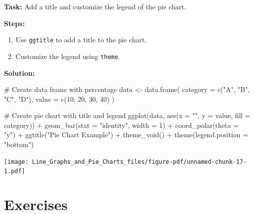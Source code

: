 \documentclass[
  letterpaper,
  DIV=11,
  numbers=noendperiod]{scrreprt}
\newenvironment{Shaded}{\begin{snugshade}}{\end{snugshade}}
\newcommand{\AttributeTok}[1]{\textcolor[rgb]{0.40,0.45,0.13}{#1}}
\newcommand{\CommentTok}[1]{\textcolor[rgb]{0.37,0.37,0.37}{#1}}
\newcommand{\DecValTok}[1]{\textcolor[rgb]{0.68,0.00,0.00}{#1}}
\newcommand{\FunctionTok}[1]{\textcolor[rgb]{0.28,0.35,0.67}{#1}}
\newcommand{\NormalTok}[1]{\textcolor[rgb]{0.00,0.23,0.31}{#1}}
\newcommand{\OtherTok}[1]{\textcolor[rgb]{0.00,0.23,0.31}{#1}}
\newcommand{\SpecialCharTok}[1]{\textcolor[rgb]{0.37,0.37,0.37}{#1}}
\newcommand{\StringTok}[1]{\textcolor[rgb]{0.13,0.47,0.30}{#1}}
\providecommand{\tightlist}{%
  \setlength{\itemsep}{0pt}\setlength{\parskip}{0pt}}\usepackage{longtable,booktabs,array}
\begin{document}
\textbf{Task:} Add a title and customize the legend of the pie chart.

\textbf{Steps:}

\begin{enumerate}
\def\labelenumi{\arabic{enumi}.}
\tightlist
\item
  Use \texttt{ggtitle} to add a title to the pie chart.
\item
  Customize the legend using \texttt{theme}.
\end{enumerate}

\textbf{Solution:}

\begin{Shaded}
\begin{Highlighting}[]
\CommentTok{\# Create data frame with percentage}
\NormalTok{data }\OtherTok{\textless{}{-}} \FunctionTok{data.frame}\NormalTok{(}
  \AttributeTok{category =} \FunctionTok{c}\NormalTok{(}\StringTok{"A"}\NormalTok{, }\StringTok{"B"}\NormalTok{, }\StringTok{"C"}\NormalTok{, }\StringTok{"D"}\NormalTok{),}
  \AttributeTok{value =} \FunctionTok{c}\NormalTok{(}\DecValTok{10}\NormalTok{, }\DecValTok{20}\NormalTok{, }\DecValTok{30}\NormalTok{, }\DecValTok{40}\NormalTok{)}
\NormalTok{)}

\CommentTok{\# Create pie chart with title and legend}
\FunctionTok{ggplot}\NormalTok{(data, }\FunctionTok{aes}\NormalTok{(}\AttributeTok{x =} \StringTok{""}\NormalTok{, }\AttributeTok{y =}\NormalTok{ value, }\AttributeTok{fill =}\NormalTok{ category)) }\SpecialCharTok{+}
  \FunctionTok{geom\_bar}\NormalTok{(}\AttributeTok{stat =} \StringTok{"identity"}\NormalTok{, }\AttributeTok{width =} \DecValTok{1}\NormalTok{) }\SpecialCharTok{+}
  \FunctionTok{coord\_polar}\NormalTok{(}\AttributeTok{theta =} \StringTok{"y"}\NormalTok{) }\SpecialCharTok{+}
  \FunctionTok{ggtitle}\NormalTok{(}\StringTok{"Pie Chart Example"}\NormalTok{) }\SpecialCharTok{+}
  \FunctionTok{theme\_void}\NormalTok{() }\SpecialCharTok{+}
  \FunctionTok{theme}\NormalTok{(}\AttributeTok{legend.position =} \StringTok{"bottom"}\NormalTok{)}
\end{Highlighting}
\end{Shaded}

\texttt{[image: Line\_Graphs\_and\_Pie\_Charts\_files/figure-pdf/unnamed-chunk-17-1.pdf]}

\section*{Exercises}\label{exercises-4}
\end{document}

